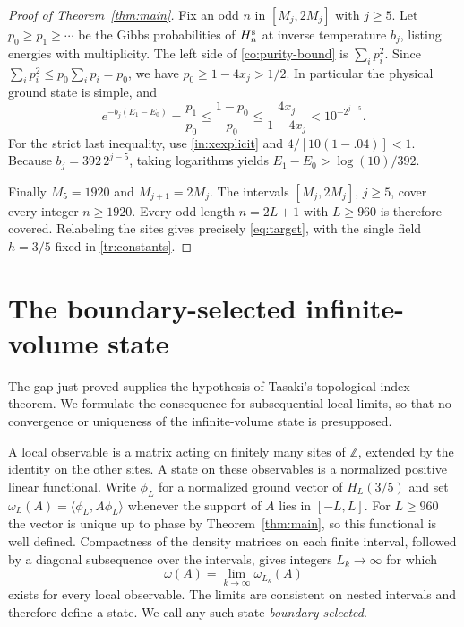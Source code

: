 \documentclass[11pt]{article}
\theoremstyle{remark}
\numberwithin{equation}{section}
\begin{document}
\begin{proof}[Proof of Theorem~\ref{thm:main}]
Fix an odd $n$ in $[M_j,2M_j]$ with $j\ge5$.
Let $p_0\ge p_1\ge\cdots$ be the Gibbs probabilities of $H_n^{\rm s}$
at inverse temperature $b_j$, listing energies with multiplicity.
The left side of \eqref{co:purity-bound} is $\sum_i p_i^2$.
Since $\sum_i p_i^2\le p_0\sum_i p_i=p_0$, we have
$p_0\ge1-4x_j>1/2$. In particular the physical ground state is
simple, and
\begin{equation}\label{co:ratio}
 e^{-b_j(E_1-E_0)}=\frac{p_1}{p_0}
 \le\frac{1-p_0}{p_0}
 \le\frac{4x_j}{1-4x_j}
 <10^{-2^{j-5}}.
\end{equation}
For the strict last inequality, use \eqref{in:xexplicit} and
$4/[10(1-.04)]<1$. Because $b_j=392\,2^{j-5}$,
taking logarithms yields $E_1-E_0>\log(10)/392$.

Finally $M_5=1920$ and $M_{j+1}=2M_j$. The intervals
$[M_j,2M_j]$, $j\ge5$, cover every integer $n\ge1920$.
Every odd length $n=2L+1$ with $L\ge960$ is therefore covered.
Relabeling the sites gives precisely \eqref{eq:target}, with the
single field $h=3/5$ fixed in \eqref{tr:constants}.
\end{proof}

\section{The boundary-selected infinite-volume state}\label{sec:topology}

The gap just proved supplies the hypothesis of Tasaki's topological-index
theorem. We formulate the consequence for subsequential local limits,
so that no convergence or uniqueness of the infinite-volume state is
presupposed.

A local observable is a matrix acting on finitely many sites of
$\mathbb Z$, extended by the identity on the other sites. A state on
these observables is a normalized positive linear functional. Write
$\phi_L$ for a normalized ground vector of $H_L(3/5)$ and set
$\omega_L(A)=\langle\phi_L,A\phi_L\rangle$ whenever the support of
$A$ lies in $[-L,L]$. For $L\ge960$ the vector is unique up to phase
by Theorem~\ref{thm:main}, so this functional is well defined.
Compactness of the density matrices on each finite interval, followed
by a diagonal subsequence over the intervals, gives integers
$L_k\to\infty$ for which
\begin{equation}\label{top:limit}
 \omega(A)=\lim_{k\to\infty}\omega_{L_k}(A)
\end{equation}
exists for every local observable. The limits are consistent on nested
intervals and therefore define a state. We call any such state
\emph{boundary-selected}.
\end{document}
